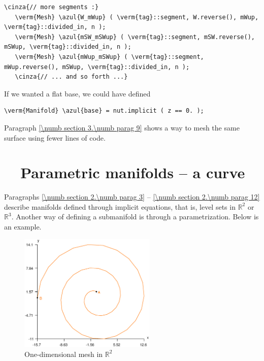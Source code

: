 \begin{Verbatim}[commandchars=\\\{\},formatcom=\small\tt,frame=single,
   label=main-\ref{\numb section 2.\numb parag 12}.cpp,rulecolor=\color{coment},
   baselinestretch=0.94,framesep=2mm]
   \cinza{// more segments :}
   \verm{Mesh} \azul{W_mWup} ( \verm{tag}::segment, W.reverse(), mWup, \verm{tag}::divided_in, n );
   \verm{Mesh} \azul{mSW_mSWup} ( \verm{tag}::segment, mSW.reverse(), mSWup, \verm{tag}::divided_in, n );
   \verm{Mesh} \azul{mWup_mSWup} ( \verm{tag}::segment, mWup.reverse(), mSWup, \verm{tag}::divided_in, n );
   \cinza{// ... and so forth ...}
\end{Verbatim}

If we wanted a flat base, we could have defined

\begin{Verbatim}[commandchars=\\\{\},formatcom=\small\tt,baselinestretch=0.94]
   \verm{Manifold} \azul{base} = nut.implicit ( z == 0. );
\end{Verbatim}

Paragraph \ref{\numb section 3.\numb parag 9} shows a way to mesh the same surface using
fewer lines of code.


\section{~~Parametric manifolds -- a curve}\label{\numb section 2.\numb parag 13}

Paragraphs \ref{\numb section 2.\numb parag 3} -- \ref{\numb section 2.\numb parag 12} describe
manifolds defined through implicit equations, that is, level sets in $ \mathbb{R}^2 $ or
$ \mathbb{R}^3 $.
Another way of defining a submanifold is through a parametrization.
Below is an example.

\begin{figure}[ht] \centering
  \includegraphics[width=65mm]{spiral}
  \caption{One-dimensional mesh in $ {\mathbb R}^2 $}
\end{figure}

